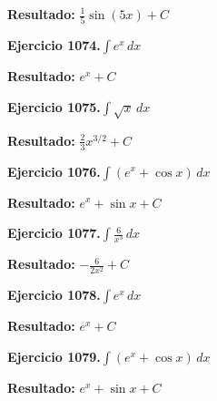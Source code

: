 \documentclass[10pt,a4paper]{article}
\begin{document}
\begin{solbox}
\textbf{Resultado:} \(\displaystyle \frac{1}{5}\sin(5x) + C\)
\end{solbox}

\begin{ejbox}
\textbf{Ejercicio 1074.}\quad $\int e^x\,dx$
\end{ejbox}

\begin{solbox}
\textbf{Resultado:} \(\displaystyle e^x + C\)
\end{solbox}

\newpage
\begin{ejbox}
\textbf{Ejercicio 1075.}\quad $\int \sqrt{x}\,dx$
\end{ejbox}

\begin{solbox}
\textbf{Resultado:} \(\displaystyle \frac{2}{3}x^{3/2} + C\)
\end{solbox}

\begin{ejbox}
\textbf{Ejercicio 1076.}\quad $\int (e^x + \cos x)\,dx$
\end{ejbox}

\begin{solbox}
\textbf{Resultado:} \(\displaystyle e^x + \sin x + C\)
\end{solbox}

\begin{ejbox}
\textbf{Ejercicio 1077.}\quad $\int \frac{6}{x^{3}}\,dx$
\end{ejbox}

\begin{solbox}
\textbf{Resultado:} \(\displaystyle -\frac{6}{2x^{2}} + C\)
\end{solbox}

\newpage
\begin{ejbox}
\textbf{Ejercicio 1078.}\quad $\int e^x\,dx$
\end{ejbox}

\begin{solbox}
\textbf{Resultado:} \(\displaystyle e^x + C\)
\end{solbox}

\begin{ejbox}
\textbf{Ejercicio 1079.}\quad $\int (e^x + \cos x)\,dx$
\end{ejbox}

\begin{solbox}
\textbf{Resultado:} \(\displaystyle e^x + \sin x + C\)
\end{solbox}
\end{document}
